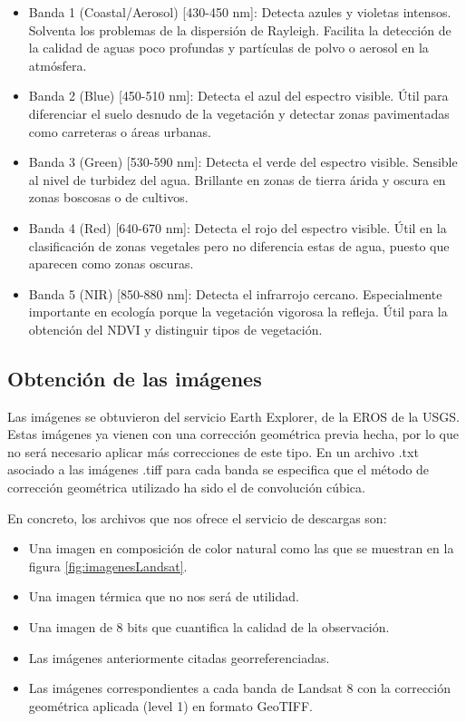 \begin{itemize}
	\item Banda 1 (Coastal/Aerosol) [430-450 nm]: Detecta azules y violetas intensos. Solventa los problemas de la dispersión de Rayleigh. Facilita la detección de la calidad de aguas poco profundas y partículas de polvo o aerosol en la atmósfera.
	\item Banda 2 (Blue) [450-510 nm]: Detecta el azul del espectro visible. Útil para diferenciar el suelo desnudo de la vegetación y detectar zonas pavimentadas como carreteras o áreas urbanas.
	\item Banda 3 (Green) [530-590 nm]: Detecta el verde del espectro visible. Sensible al nivel de turbidez del agua. Brillante en zonas de tierra árida y oscura en zonas boscosas o de cultivos.
	\item Banda 4 (Red) [640-670 nm]: Detecta el rojo del espectro visible. Útil en la clasificación de zonas vegetales pero no diferencia estas de agua, puesto que aparecen como zonas oscuras.
	\item Banda 5 (NIR) [850-880 nm]: Detecta el infrarrojo cercano. Especialmente importante en ecología porque la vegetación vigorosa la refleja. Útil para la obtención del \ac{NDVI} y distinguir tipos de vegetación.
\end{itemize}


\subsection{Obtención de las imágenes}
Las imágenes se obtuvieron del servicio Earth Explorer, de la \ac{EROS} de la \ac{USGS}. Estas imágenes ya vienen con una corrección geométrica previa hecha, por lo que no será necesario aplicar más correcciones de este tipo. En un archivo .txt asociado a las imágenes .tiff para cada banda se especifica que el método de corrección geométrica utilizado ha sido el de convolución cúbica.\Sep

En concreto, los archivos que nos ofrece el servicio de descargas son:

\begin{itemize}
	\item Una imagen en composición de color natural como las que se muestran en la figura \ref{fig:imagenesLandsat}.
	\item Una imagen térmica que no nos será de utilidad.
	\item Una imagen de 8 bits que cuantifica la calidad de la observación.
	\item Las imágenes anteriormente citadas georreferenciadas.
	\item Las imágenes correspondientes a cada banda de Landsat 8 con la corrección geométrica aplicada (level 1) en formato GeoTIFF.
\end{itemize}\Sep

